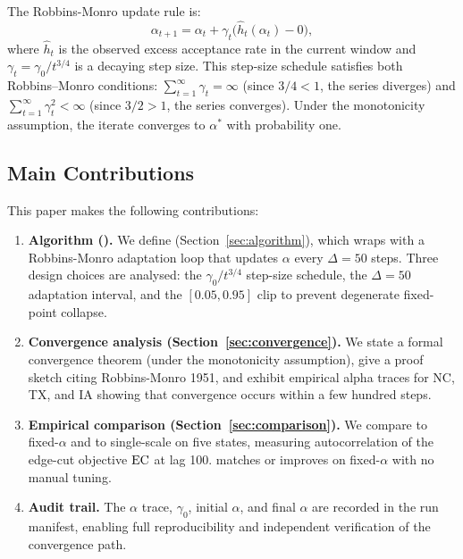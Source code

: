 The Robbins-Monro update rule is:
\[
  \alpha_{t+1} = \alpha_t + \gamma_t \bigl(\hat{h}_t(\alpha_t) - 0\bigr),
\]
where $\hat{h}_t$ is the observed excess acceptance rate in the current window
and $\gamma_t = \gamma_0 / t^{3/4}$ is a decaying step size.
This step-size schedule satisfies both Robbins--Monro conditions:
$\sum_{t=1}^\infty \gamma_t = \infty$ (since $3/4 < 1$, the series diverges) and
$\sum_{t=1}^\infty \gamma_t^2 < \infty$ (since $3/2 > 1$, the series converges).
Under the monotonicity assumption, the iterate converges to $\alpha^*$
with probability one.

\subsection{Main Contributions}

This paper makes the following contributions:

\begin{enumerate}
  \item \textbf{Algorithm (\ams{}).}
    We define \ams{} (Section~\ref{sec:algorithm}), which wraps \ms{} with
    a Robbins-Monro adaptation loop that updates $\alpha$ every
    $\Delta = 50$ steps.
    Three design choices are analysed: the $\gamma_0/t^{3/4}$ step-size
    schedule, the $\Delta = 50$ adaptation interval, and the $[0.05, 0.95]$
    clip to prevent degenerate fixed-point collapse.

  \item \textbf{Convergence analysis (Section~\ref{sec:convergence}).}
    We state a formal convergence theorem (under the monotonicity assumption),
    give a proof sketch citing Robbins-Monro 1951, and exhibit empirical
    alpha traces for NC, TX, and IA showing that convergence occurs within a
    few hundred steps.

  \item \textbf{Empirical comparison (Section~\ref{sec:comparison}).}
    We compare \ams{} to fixed-$\alpha$ \ms{} and to single-scale \recom{}
    on five states, measuring autocorrelation of the edge-cut objective
    $\mathrm{EC}$ at lag 100.
    \ams{} matches or improves on fixed-$\alpha$ \ms{} with no manual tuning.

  \item \textbf{Audit trail.}
    The $\alpha$ trace, $\gamma_0$, initial $\alpha$, and final $\alpha$ are
    recorded in the run manifest, enabling full reproducibility and independent
    verification of the convergence path.
\end{enumerate}

